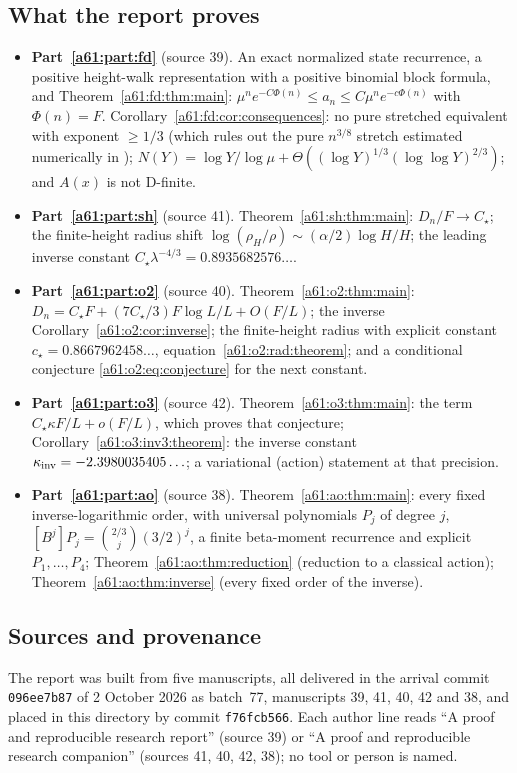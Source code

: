 \documentclass[11pt,letterpaper]{article}
\numberwithin{equation}{section}
\theoremstyle{remark}\newtheorem{remark}[theorem]{Remark}
\begin{document}
\subsection*{What the report proves}
\label{a61:guide:results}
\begin{itemize}
\item \textbf{Part~\ref{a61:part:fd}} (source 39). An exact normalized state recurrence, a positive height-walk representation with a positive binomial block formula, and Theorem~\ref{a61:fd:thm:main}: $\mu^ne^{-C\Phi(n)}\le a_n\le C\mu^ne^{-c\Phi(n)}$ with $\Phi(n)=F$. Corollary~\ref{a61:fd:cor:consequences}: no pure stretched equivalent with exponent $\ge1/3$ (which rules out the pure $n^{3/8}$ stretch estimated numerically in \cite{Conway}); $N(Y)=\log Y/\log\mu+\Theta((\log Y)^{1/3}(\log\log Y)^{2/3})$; and $A(x)$ is not D-finite.
\item \textbf{Part~\ref{a61:part:sh}} (source 41). Theorem~\ref{a61:sh:thm:main}: $D_n/F\to C_\star$; the finite-height radius shift $\log(\rho_H/\rho)\sim(\alpha/2)\log H/H$; the leading inverse constant $C_\star\lambda^{-4/3}=0.8935682576\ldots$.
\item \textbf{Part~\ref{a61:part:o2}} (source 40). Theorem~\ref{a61:o2:thm:main}: $D_n=C_\star F+(7C_\star/3)F\log L/L+O(F/L)$; the inverse Corollary~\ref{a61:o2:cor:inverse}; the finite-height radius with explicit constant $c_\star=0.8667962458\ldots$, equation~\eqref{a61:o2:rad:theorem}; and a conditional conjecture \eqref{a61:o2:eq:conjecture} for the next constant.
\item \textbf{Part~\ref{a61:part:o3}} (source 42). Theorem~\ref{a61:o3:thm:main}: the term $C_\star\kappa F/L+o(F/L)$, which proves that conjecture; Corollary~\ref{a61:o3:inv3:theorem}: the inverse constant $\kappa_{\rm inv}=-2.3980035405\ldots$; a variational (action) statement at that precision.
\item \textbf{Part~\ref{a61:part:ao}} (source 38). Theorem~\ref{a61:ao:thm:main}: every fixed inverse-logarithmic order, with universal polynomials $P_j$ of degree $j$, $[B^j]P_j=\binom{2/3}{j}(3/2)^j$, a finite beta-moment recurrence and explicit $P_1,\ldots,P_4$; Theorem~\ref{a61:ao:thm:reduction} (reduction to a classical action); Theorem~\ref{a61:ao:thm:inverse} (every fixed order of the inverse).
\end{itemize}

\subsection*{Sources and provenance}
\label{a61:guide:provenance}
The report was built from five manuscripts, all delivered in the arrival commit \texttt{096ee7b87} of 2 October 2026 as batch~77, manuscripts 39, 41, 40, 42 and 38, and placed in this directory by commit \texttt{f76fcb566}. Each author line reads ``A proof and reproducible research report'' (source 39) or ``A proof and reproducible research companion'' (sources 41, 40, 42, 38); no tool or person is named.
\end{document}
